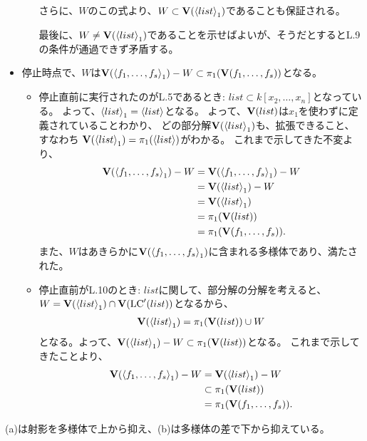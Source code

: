 \begin{myproof}
\begin{itemize}
\begin{itemize}
      さらに、$W$のこの式より、$W \subset \textbf V(\left\langle list \right\rangle_1)$であることも保証される。

      最後に、$W\neq \textbf V(\left\langle list \right\rangle_1)$であることを示せばよいが、そうだとするとL.9の条件が通過できず矛盾する。
    \end{itemize}
    \item 停止時点で、$W$は$\textbf V(\left\langle f_1,\dots,f_s \right\rangle_1)-W \subset \pi_1(\textbf V(f_1,\dots,f_s))$となる。
    \begin{itemize}
      \item 停止直前に実行されたのがL.5であるとき:
      $list\subset k[x_2,\dots,x_n]$となっている。
      よって、$\left\langle list \right\rangle_1 = \left\langle list \right\rangle$となる。
      よって、$\textbf V(list)$は$x_1$を使わずに定義されていることわかり、
      どの部分解$\textbf V(\left\langle list \right\rangle_1)$も、拡張できること、すなわち
      $\textbf V(\left\langle list \right\rangle_1) = \pi_1(\left\langle list \right\rangle)$がわかる。
      これまで示してきた不変より、
      \begin{align}
        \textbf V(\left\langle f_1,\dots,f_s \right\rangle_1)-W
        &=
        \textbf V(\left\langle f_1,\dots,f_s \right\rangle_1)-W\\
        &=
        \textbf V(\left\langle list \right\rangle_1)-W\\
        &=
        \textbf V(\left\langle list \right\rangle_1)\\
        &=
        \pi_1(\textbf V(list))\\
        &=
        \pi_1(\textbf V(f_1,\dots,f_s)).
      \end{align}
      また、$W$はあきらかに$\textbf V(\left\langle f_1,\dots,f_s \right\rangle_1)$に含まれる多様体であり、満たされた。
      \item 停止直前がL.10のとき:
      $list$に関して、部分解の分解を考えると、$W= \textbf V(\left\langle list \right\rangle_1) \cap \textbf V({\rm LC}'(list))$となるから、
      \begin{align}
        \textbf V(\left\langle list \right\rangle_1)
        =
        \pi_1(\textbf V(list)) \cup W
      \end{align}
      となる。よって、$\textbf V(\left\langle list \right\rangle_1)-W\subset \pi_1(\textbf V(list))$となる。
      これまで示してきたことより、
      \begin{align}
        \textbf V(\left\langle f_1,\dots,f_s \right\rangle_1)-W
        &=
        \textbf V(\left\langle list \right\rangle_1)-W\\
        &\subset
        \pi_1(\textbf V(list))\\
        &=
        \pi_1(\textbf V(f_1,\dots,f_s)).
      \end{align}

    \end{itemize}
  \end{itemize}
\end{myproof}
(a)は射影を多様体で上から抑え、(b)は多様体の差で下から抑えている。

